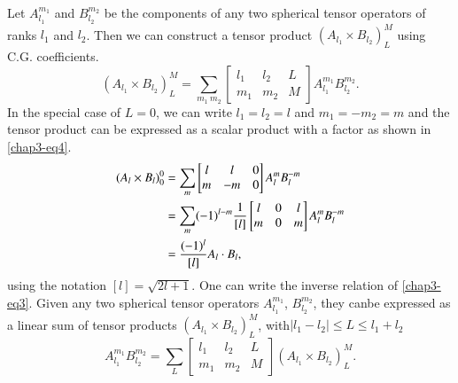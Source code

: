 Let $A_{l_1}^{m_1}$ and $B_{l_2}^{m_2}$ be the components of any two spherical tensor operators of ranks $l_1$ and $l_2$. Then we can construct a tensor product $(A_{l_1} \times B_{l_2})^M_L$ using C.G. coefficients.
\begin{equation}
(A_{l_1} \times B_{l_2})^M_L = \sum_{m_1 ~m_2} 
\begin{bmatrix}
  l_1 & l_2 & L\\
  m_1 & m_2 & M
\end{bmatrix}
A_{l_1}^{m_1} B_{l_2}^{m_2}.  \label{chap3-eq3}
\end{equation}
In the special case of $L = 0$, we can write $l_1 = l_2 = l$ and $m_1 = -m_2 = m$ and the
tensor product can be expressed as a scalar product with a factor as shown in \eqref{chap3-eq4}.
\begin{align}
  (A_l \times B_l)^0_0 & = \sum_{m}
  \begin{bmatrix}  l & l & 0\\    m & -m & 0  \end{bmatrix}  A_l^m B_l^{-m}\notag\\
  & = \sum_m (-1)^{l-m} \frac{1}{[l]}
  \begin{bmatrix}    l & 0 & l\\    m & 0 & m  \end{bmatrix}  A_l^m B_l^{-m}\notag\\
  & = \frac{(-1)^l}{[l]} A_l \cdot B_l, \label{chap3-eq4}
\end{align}
using the notation $[l]=\sqrt{2l+1}$. One can write the inverse relation of \eqref{chap3-eq3}. Given any two spherical tensor operators $A_{l_1}^{m_1}$, $B_{l_2}^{m_2}$, they can\break be expressed as a linear sum of tensor products $(A_{l_1} \times B_{l_2})^M_L$, with\break $|l_1 -  l_2 | \leq L \leq l_1 + l_2$ 
\begin{equation}
A_{l_1}^{m_1} B_{l_2}^{m_2} = \sum_{L} 
\begin{bmatrix}
l_1 & l_2 &L\\
m_1 & m_2 & M
\end{bmatrix} (A_{l_1} \times B_{l_2})^M_L. \label{chap3-eq5}
\end{equation}

